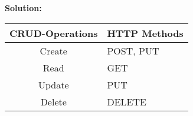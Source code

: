 \begin{task}{}{}{}{}{}{}
\begin{subtask}{2}
		\begin{solution}
			\textbf{Solution:}
			\begin{center}
				\begin{tabular}{|c|l|}
					\hline
					\textbf{CRUD-Operations} & \textbf{HTTP Methods} \\ \hline
					Create                   & POST, PUT             \\ \hline
					Read                     & GET                   \\ \hline
					Update                   & PUT                   \\ \hline
					Delete                   & DELETE                \\ \hline
					\end{tabular}
			  \end{center}
		\end{solution}
	\end{subtask}
\end{task}
